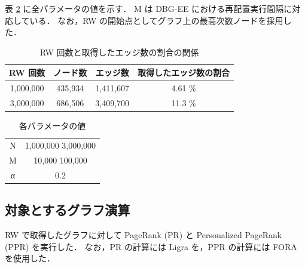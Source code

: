 表 \ref{parameter} に全パラメータの値を示す．
M は DBG-EE における再配置実行間隔に対応している．
なお，RW の開始点としてグラフ上の最高次数ノードを採用した．
\begin{table}[t]
  \begin{center}
    \caption{RW 回数と取得したエッジ数の割合の関係}
    \begin{tabular}{cccc} \toprule
      RW 回数 & ノード数 & エッジ数 & 取得したエッジ数の割合 \\ \hline
      1,000,000 & 435,934 & 1,411,607 & 4.61 \% \\
      3,000,000 & 686,506 & 3,409,700 & 11.3 \% \\ \bottomrule
    \end{tabular}
    \label{rw_graph}
  \end{center}
\end{table}
\begin{table}[t]
  \begin{center}
    \caption{各パラメータの値}
    \begin{tabular}{cc} \toprule
      N & 1,000,000 3,000,000 \\
      M & 10,000 100,000 \\
      α & 0.2 \\ \bottomrule
    \end{tabular}
    \label{parameter}
  \end{center}
\end{table}


\subsection{対象とするグラフ演算}
RW で取得したグラフに対して PageRank (PR) と Personalized PageRank (PPR) を実行した．
なお，PR の計算には Ligra \cite{shun2013ligra} を，PPR の計算には FORA \cite{wang2017fora} を使用した．

